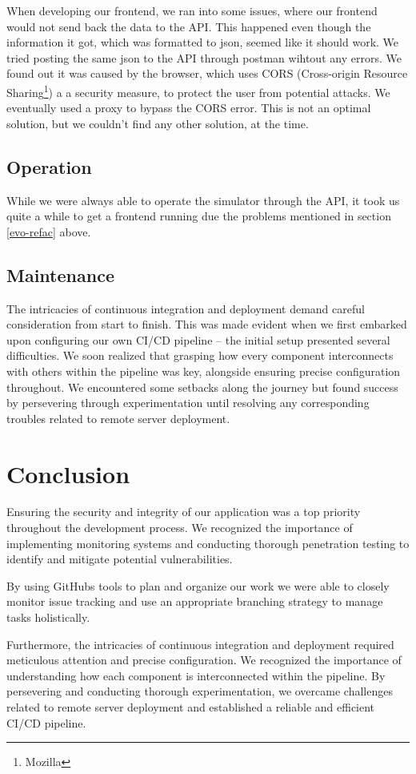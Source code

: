 \documentclass{article}
\begin{document}
When developing our frontend, we ran into some issues, where our frontend would not send back the data to the API. This happened even though the information it got, which was formatted to json, seemed like it should work. We tried posting the same json to the API through postman wihtout any errors. We found out it was caused by the browser, which uses CORS (Cross-origin Resource Sharing\footnote{Mozilla}) a a security measure, to protect the user from potential attacks. We eventually used a proxy to bypass the CORS error. This is not an optimal solution, but we couldn't find any other solution, at the time. 

\subsection{Operation}
While we were always able to operate the simulator through the API, it took us quite a while to get a frontend running due the problems mentioned in section \ref{evo-refac} above.

\subsection{Maintenance}
The intricacies of continuous integration and deployment demand careful consideration from start to finish. This was made evident when we first embarked upon configuring our own CI/CD pipeline – the initial setup presented several difficulties. 
We soon realized that grasping how every component interconnects with others within the pipeline was key, alongside ensuring precise configuration throughout. We encountered some setbacks along the journey but found success by persevering through experimentation until resolving any corresponding troubles related to remote server deployment.


\section{Conclusion}
Ensuring the security and integrity of our application was a top priority throughout the development process. We recognized the importance of implementing monitoring systems and conducting thorough penetration testing to identify and mitigate potential vulnerabilities.

By using GitHubs tools to plan and organize our work we were able to closely monitor issue tracking and use an appropriate branching strategy to manage tasks holistically.

Furthermore, the intricacies of continuous integration and deployment required meticulous attention and precise configuration. We recognized the importance of understanding how each component is interconnected within the pipeline. By persevering and conducting thorough experimentation, we overcame challenges related to remote server deployment and established a reliable and efficient CI/CD pipeline.
\end{document}
